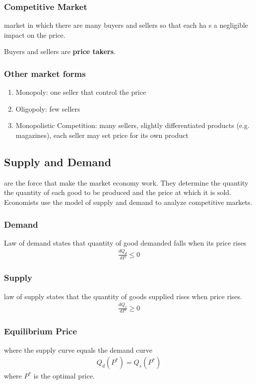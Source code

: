 \documentclass[a4paper,titlepage] {scrartcl}
\begin{document}
\subsubsection{Competitive Market}
market in which there are many buyers and sellers so that each ha s a negligible impact on the price.

Buyers and sellers are \textbf{price takers}.

\subsubsection{Other market forms}
\begin{enumerate}
	\item Monopoly: one seller that control the price
	\item Oligopoly: few sellers
	\item Monopolistic Competition: many sellers, slightly differentiated products (e.g. magazines), each seller may set price for its own product
\end{enumerate}

\subsection{Supply and Demand}
are the force that make the market economy work. They determine the quantity the quantity of each good to be produced and the price at which it is sold. Economists use the model of supply and demand to analyze competitive markets.

\subsubsection{Demand}
Law of demand states that quantity of good demanded falls when its price rises
\begin{eqnarray*}
	\frac{dQ_d}{dP}\leq0
\end{eqnarray*}

\subsubsection{Supply}
law of supply states that the quantity of goods supplied rises when price rises.
\begin{eqnarray*}
	\frac{dQ_s}{dP}\geq0
\end{eqnarray*}
\subsubsection{Equilibrium Price}
where the supply curve equals the demand curve
\begin{eqnarray*}
	Q_d(P^*)=Q_s(P^*)
\end{eqnarray*}
where $P^*$ is the optimal price.
\end{document}
